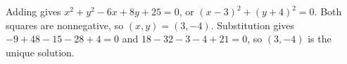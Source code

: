 Adding gives $x^2+y^2-6x+8y+25=0$, or $(x-3)^2+(y+4)^2=0$. Both squares are nonnegative, so $(x,y)=(3,-4)$. Substitution gives $-9+48-15-28+4=0$ and $18-32-3-4+21=0$, so $\boxed{(3,-4)}$ is the unique solution.
